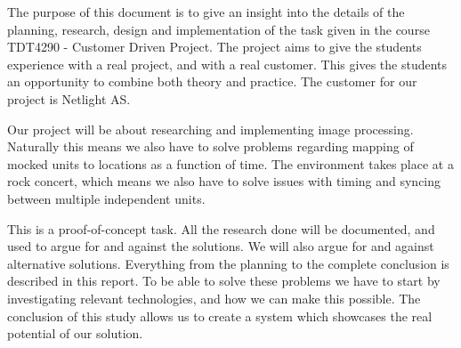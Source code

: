 The purpose of this document is to give an insight into the details of the planning, research, design and implementation of the task given in the course TDT4290 - Customer Driven Project. 
The project aims to give the students experience with a real project, and with a real customer. 
This gives the students an opportunity to combine both theory and practice. 
The customer for our project is Netlight AS.  

Our project will be about researching and implementing image processing. 
Naturally this means we also have to solve problems regarding mapping of mocked units to locations as a function of time. 
The environment takes place at a rock concert, which means we also have to solve issues with timing and syncing between multiple independent units.

This is a proof-of-concept task.  
All the research done will be documented, and used to argue for and against the solutions. 
We will also argue for and against alternative solutions. Everything from the planning to the complete conclusion is described in this report. 
To be able to solve these problems we have to start by investigating relevant technologies, and how we can make this possible.
The conclusion of this study allows us to create a system which showcases the real potential of our solution.

